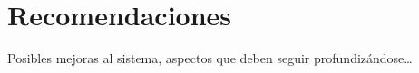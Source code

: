 \chapter*{\large Recomendaciones}

\lettrine[lines=2, lraise=0, nindent=0em, slope=-.5em]{P}{}osibles mejoras al sistema, aspectos que deben 
seguir profundizándose\ldots